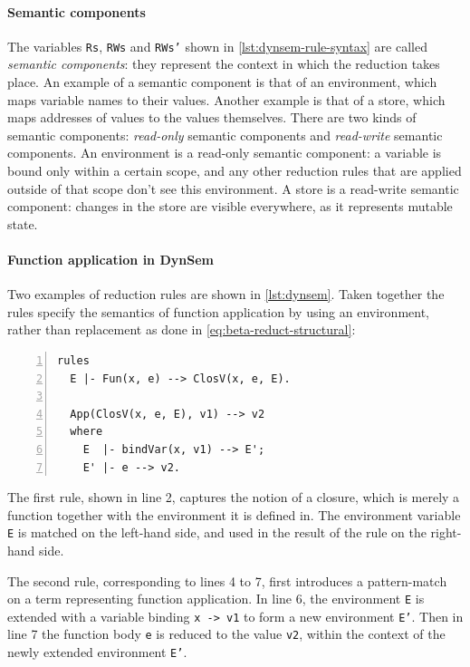 \paragraph{Semantic components} The variables \texttt{Rs}, \texttt{RWs} and
\texttt{RWs'} shown in \cref{lst:dynsem-rule-syntax} are called \textit{semantic
  components}: they represent the context in which the reduction takes place. An
example of a semantic component is that of an environment, which maps variable
names to their values. Another example is that of a store, which maps addresses
of values to the values themselves. There are two kinds of semantic components:
\textit{read-only} semantic components and \textit{read-write} semantic
components. An environment is a read-only semantic component: a variable is
bound only within a certain scope, and any other reduction rules that are
applied outside of that scope don't see this environment. A store is a
read-write semantic component: changes in the store are visible everywhere, as
it represents mutable state.

\paragraph{Function application in DynSem} Two examples of reduction rules are
shown in \cref{lst:dynsem}. Taken together the rules specify the semantics of
function application by using an environment, rather than replacement as done in
\cref{eq:beta-reduct-structural}:

\begin{minipage}[t]{\linewidth}
\begin{lstlisting}[language=dynsem,numbers=left,caption={Specifying function
application through the use of an environment.},label={lst:dynsem}]
rules
  E |- Fun(x, e) --> ClosV(x, e, E).

  App(ClosV(x, e, E), v1) --> v2
  where
    E  |- bindVar(x, v1) --> E';
    E' |- e --> v2.
\end{lstlisting}
\end{minipage}

The first rule, shown in line 2, captures the notion of a closure, which is
merely a function together with the environment it is defined in. The
environment variable \texttt{E} is matched on the left-hand side, and used in
the result of the rule on the right-hand side.

The second rule, corresponding to lines 4 to 7, first introduces a pattern-match
on a term representing function application. In line 6, the environment
\texttt{E} is extended with a variable binding \texttt{x -> v1} to form a new
environment \texttt{E'}. Then in line 7 the function body \texttt{e} is reduced
to the value \texttt{v2}, within the context of the newly extended environment
\texttt{E'}.

